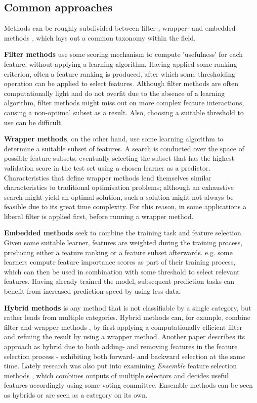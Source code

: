 \documentclass{article}
\begin{document}
\subsection{Common approaches}
Methods can be roughly subdivided between filter-, wrapper- and embedded methods \citep{chandrashekar2014survey}, which lays out a common taxonomy within the field.

\textbf{Filter methods} use some scoring mechanism to compute 'usefulness' for each feature, without applying a learning algorithm. Having applied some ranking criterion, often a feature ranking is produced, after which some thresholding operation can be applied to select features. Although filter methods are often computationally light and do not overfit due to the absence of a learning algorithm, filter methods might miss out on more complex feature interactions, causing a non-optimal subset as a result. Also, choosing a suitable threshold to use can be difficult.

\textbf{Wrapper methods}, on the other hand, use some learning algorithm to determine a suitable subset of features. A search is conducted over the space of possible feature subsets, eventually selecting the subset that has the highest validation score in the test set using a chosen learner as a predictor. Characteristics that define wrapper methods lend themselves similar characteristics to traditional optimisation problems; although an exhaustive search might yield an optimal solution, such a solution might not always be feasible due to its great time complexity. For this reason, in some applications a liberal filter is applied first, before running a wrapper method.

\textbf{Embedded methods} seek to combine the training task and feature selection. Given some suitable learner, features are weighted during the training process, producing either a feature ranking or a feature subset afterwards. e.g. some learners compute feature importance scores as part of their training process, which can then be used in combination with some threshold to select relevant features. Having already trained the model, subsequent prediction tasks can benefit from increased prediction speed by using less data.

\textbf{Hybrid methods} is any method that is not classifiable by a single category, but rather lends from multiple categories. Hybrid methods can, for example, combine filter and wrapper methods \citep{hsu2011hybrid}, by first applying a computationally efficient filter and refining the result by using a wrapper method. Another paper \citep{das2001filters} describes its approach as hybrid due to both adding- and removing features in the feature selection process - exhibiting both forward- and backward selection at the same time. Lately research was also put into examining \textit{Ensemble} feature selection methods \citep{bolon2019ensembles}, which combines outputs of multiple selectors and decides useful features accordingly using some voting committee. Ensemble methods can be seen as hybrids or are seen as a category on its own.
\end{document}
